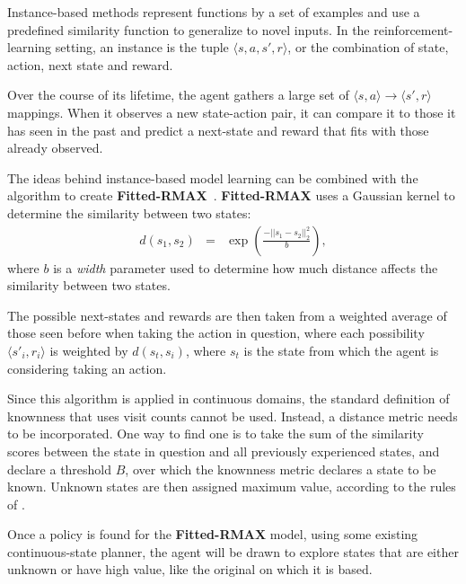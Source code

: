 Instance-based methods represent functions by a set of examples and use a predefined similarity function to generalize to novel inputs. In the reinforcement-learning setting, an instance is the tuple $\langle s, a, s', r \rangle$, or the combination of state, action, next state and reward.

Over the course of its lifetime, the agent gathers a large set of $\langle s, a\rangle \rightarrow \langle s', r \rangle$ mappings. When it observes a new state-action pair, it can compare it to those it has seen in the past and predict a next-state and reward that fits with those already observed.

The ideas behind instance-based model learning can be combined with the  algorithm to create {\bf Fitted-RMAX}~\cite{jong07}. {\bf Fitted-RMAX} uses a Gaussian kernel to determine the similarity between two states:
\begin{eqnarray}
d(s_1,s_2)&=&\exp\left(\frac{-||s_1 - s_2||^2_2}{b}\right),
\end{eqnarray}
where $b$ is a \emph{width} parameter used to determine how much distance affects the similarity between two states.

The possible next-states and rewards are then taken from a weighted average of those seen before when taking the action in question, where each possibility $\langle s'_i, r_i \rangle$ is weighted by $d(s_t, s_i)$, where $s_t$ is the state from which the agent is considering taking an action.


Since this algorithm is applied in continuous domains, the standard definition of knownness that uses visit counts cannot be used.  Instead, a distance metric needs to be incorporated. One way to find one is to take the sum of the similarity scores between the state in question and all previously experienced states, and declare a threshold $B$, over which the knownness metric declares a state to be known.  Unknown states are then assigned maximum value, according to the rules of .

Once a policy is found for the {\bf Fitted-RMAX} model, using some existing continuous-state planner, the agent will be drawn to explore states that are either unknown or have high value, like the original  on which it is based.



